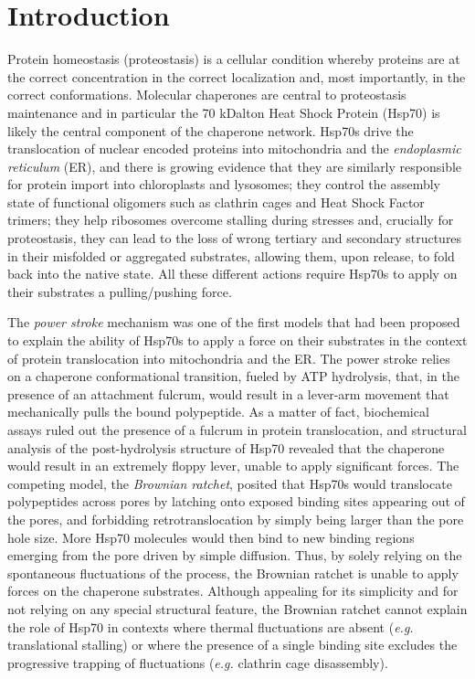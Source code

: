 \documentclass[10pt,letterpaper]{article}
\begin{document}
\section*{Introduction}
Protein homeostasis (proteostasis) is a cellular condition whereby proteins are at the correct concentration in the correct localization and, most importantly, in the correct conformations. Molecular chaperones are central to proteostasis maintenance and in particular the 70 kDalton Heat Shock Protein (Hsp70) is likely the central component of the chaperone network. Hsp70s drive the translocation of nuclear encoded proteins into mitochondria and the \textit{endoplasmic reticulum} (ER), and there is growing evidence that they are similarly responsible for protein import into chloroplasts and lysosomes; they control the assembly state of functional oligomers such as clathrin cages and Heat Shock Factor trimers; they help ribosomes overcome stalling during stresses and, crucially for proteostasis, they can lead to the loss of wrong tertiary and secondary structures in their misfolded or aggregated substrates, allowing them, upon release, to fold back into the native state. All these different actions require Hsp70s to apply on their substrates a  pulling/pushing force. 

The \textit{power stroke} mechanism was one of the first models that had been proposed to explain the ability of Hsp70s to apply a force on their substrates in the context of protein translocation into mitochondria and the ER. The power stroke relies on a chaperone conformational transition, fueled by ATP hydrolysis, that, in the presence of an attachment fulcrum, would result in a lever-arm movement that mechanically pulls the bound polypeptide. As a matter of fact, biochemical assays ruled out the presence of a fulcrum
in protein translocation, and structural analysis of the post-hydrolysis structure of Hsp70 revealed that the chaperone would result in an extremely floppy lever, unable to apply significant forces. The competing model, the \textit{Brownian ratchet}, posited that Hsp70s would translocate polypeptides across pores by latching onto exposed binding sites appearing out of the pores, and forbidding retrotranslocation by simply being larger than the pore hole size. More Hsp70 molecules would then bind to new binding regions emerging from the pore driven by simple diffusion. Thus, by solely relying on the spontaneous fluctuations of the process, the Brownian ratchet is unable to apply forces on the chaperone substrates. Although appealing for its simplicity and for not relying on any special structural feature, the Brownian ratchet cannot explain the role of Hsp70 in contexts where thermal fluctuations are absent (\textit{e.g.} translational stalling) or where the presence of a single binding site excludes the progressive trapping of fluctuations (\textit{e.g.} clathrin cage disassembly).
\end{document}

